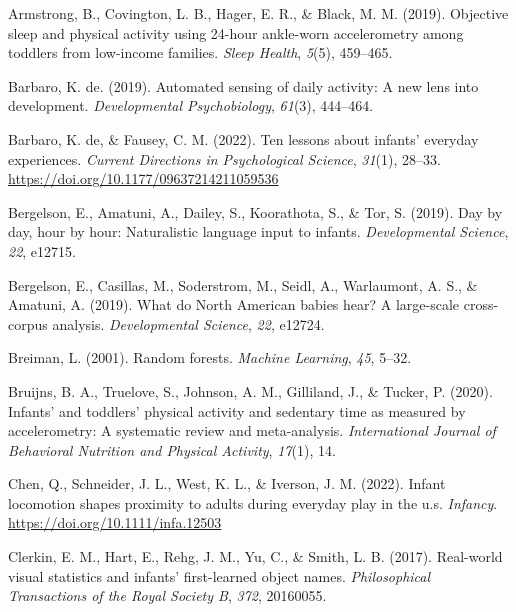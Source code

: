 \documentclass[
  man]{apa6}
\newlength{\cslhangindent}
\newlength{\cslentryspacingunit} %
\newenvironment{CSLReferences}[2] %
 {%
  \setlength{\parindent}{0pt}
  \ifodd #1
  \let\oldpar\par
  \def\par{\hangindent=\cslhangindent\oldpar}
  \fi
  \setlength{\parskip}{#2\cslentryspacingunit}
 }%
 {}
\begin{document}
\begin{CSLReferences}{1}{0}
\leavevmode{}%
Armstrong, B., Covington, L. B., Hager, E. R., \& Black, M. M. (2019). Objective sleep and physical activity using 24-hour ankle-worn accelerometry among toddlers from low-income families. \emph{Sleep Health}, \emph{5}(5), 459--465.

\leavevmode{}%
Barbaro, K. de. (2019). Automated sensing of daily activity: A new lens into development. \emph{Developmental Psychobiology}, \emph{61}(3), 444--464.

\leavevmode{}%
Barbaro, K. de, \& Fausey, C. M. (2022). Ten lessons about infants' everyday experiences. \emph{Current Directions in Psychological Science}, \emph{31}(1), 28--33. \url{https://doi.org/10.1177/09637214211059536}

\leavevmode{}%
Bergelson, E., Amatuni, A., Dailey, S., Koorathota, S., \& Tor, S. (2019). Day by day, hour by hour: Naturalistic language input to infants. \emph{Developmental Science}, \emph{22}, e12715.

\leavevmode{}%
Bergelson, E., Casillas, M., Soderstrom, M., Seidl, A., Warlaumont, A. S., \& Amatuni, A. (2019). What do {N}orth {A}merican babies hear? {A} large-scale cross-corpus analysis. \emph{Developmental Science}, \emph{22}, e12724.

\leavevmode{}%
Breiman, L. (2001). Random forests. \emph{Machine Learning}, \emph{45}, 5--32.

\leavevmode{}%
Bruijns, B. A., Truelove, S., Johnson, A. M., Gilliland, J., \& Tucker, P. (2020). Infants' and toddlers' physical activity and sedentary time as measured by accelerometry: A systematic review and meta-analysis. \emph{International Journal of Behavioral Nutrition and Physical Activity}, \emph{17}(1), 14.

\leavevmode{}%
Chen, Q., Schneider, J. L., West, K. L., \& Iverson, J. M. (2022). Infant locomotion shapes proximity to adults during everyday play in the u.s. \emph{Infancy}. \url{https://doi.org/10.1111/infa.12503}

\leavevmode{}%
Clerkin, E. M., Hart, E., Rehg, J. M., Yu, C., \& Smith, L. B. (2017). Real-world visual statistics and infants' first-learned object names. \emph{Philosophical Transactions of the Royal Society B}, \emph{372}, 20160055.


\end{CSLReferences}
\end{document}

